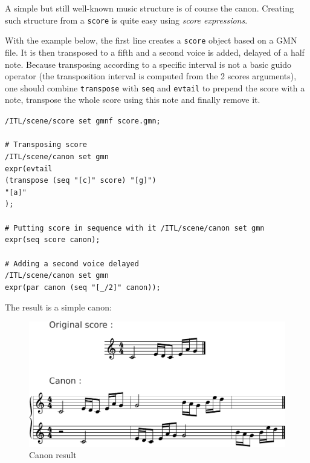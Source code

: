 \documentclass{article}
\newcommand{\OSC}[1]{{\fontsize{10pt}{10pt} \selectfont\texttt{#1}}}
\newcommand{\sExpr}{\emph{score expressions}}
\newcommand{\tab}{\hspace*{4mm}}
\newcommand{\sample}	[1]			{\vspace{-0.2em}\begin{center}\colorbox{mygrey}{\begin{minipage}[t]{0.95\columnwidth} {\small \texttt{#1}}\end{minipage}}\end{center}}
\begin{document}
A simple but still well-known music structure is of course the canon. Creating such structure from a \OSC{score} is quite easy using \sExpr.

With the example below, the first line creates a \OSC{score} object based on a GMN file. It is then transposed to a fifth and a second voice is added, delayed of a half note. Because transposing according to a specific interval is not a basic guido operator (the transposition interval is computed from the 2 scores arguments), one should combine \OSC{transpose} with \OSC{seq} and \OSC{evtail} to prepend the score with a note, transpose the whole score using this note and finally remove it.

\sample{/ITL/scene/score set gmnf score.gmn;\\
\\
\# Transposing score\\
/ITL/scene/canon set gmn\\
\tab expr(evtail\\
\tab\tab(transpose (seq "[c]" score) "[g]")\\
\tab\tab"[a]"\\
\tab);\\
\\
\# Putting score in sequence with it
/ITL/scene/canon set gmn\\
\tab expr(seq score canon);\\
\\
\# Adding a second voice delayed\\
/ITL/scene/canon set gmn\\
\tab expr(par canon (seq "[\_/2]" canon));
}

The result is a simple canon:
\begin{figure}[th]
\centering
\includegraphics[width=1.\columnwidth]{imgs/exampleCanon}
\caption{Canon result
\label{fig:canonFig}}
\end{figure}
\end{document}
